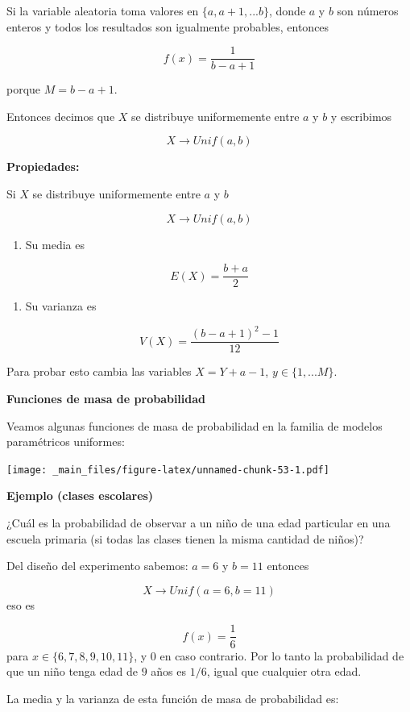 \documentclass[
]{book}
\providecommand{\tightlist}{%
  \setlength{\itemsep}{0pt}\setlength{\parskip}{0pt}}
\begin{document}
Si la variable aleatoria toma valores en \(\{a, a+1, ...b\}\), donde \(a\) y \(b\) son números enteros y todos los resultados son igualmente probables, entonces

\[f(x)=\frac{1}{b-a+1}\]

porque \(M=b-a+1\).

Entonces decimos que \(X\) se distribuye uniformemente entre \(a\) y \(b\) y escribimos

\[X \rightarrow Unif(a,b)\]

\textbf{Propiedades:}

Si \(X\) se distribuye uniformemente entre \(a\) y \(b\)

\[X \rightarrow Unif(a,b)\]

\begin{enumerate}
\def\labelenumi{\arabic{enumi})}
\tightlist
\item
  Su media es
\end{enumerate}

\[E(X)= \frac{b+a}{2}\]

\begin{enumerate}
\def\labelenumi{\arabic{enumi})}
\setcounter{enumi}{1}
\tightlist
\item
  Su varianza es
\end{enumerate}

\[V(X)= \frac{(b-a+1)^2-1}{12}\]

Para probar esto cambia las variables \(X=Y+a-1\), \(y \in \{1,...M\}\).

\textbf{Funciones de masa de probabilidad}

Veamos algunas funciones de masa de probabilidad en la familia de modelos paramétricos uniformes:

\texttt{[image: \_main\_files/figure-latex/unnamed-chunk-53-1.pdf]}

\textbf{Ejemplo (clases escolares)}

¿Cuál es la probabilidad de observar a un niño de una edad particular en una escuela primaria (si todas las clases tienen la misma cantidad de niños)?

Del diseño del experimento sabemos: \(a=6\) y \(b=11\) entonces

\[X \rightarrow Unif(a=6, b=11)\] eso es

\[f(x)=\frac{1}{6}\] para \(x\in \{6,7,8,9,10,11\}\), y \(0\) en caso contrario. Por lo tanto la probabilidad de que un niño tenga edad de \(9\) años es \(1/6\), igual que cualquier otra edad.

La media y la varianza de esta función de masa de probabilidad es:
\end{document}
